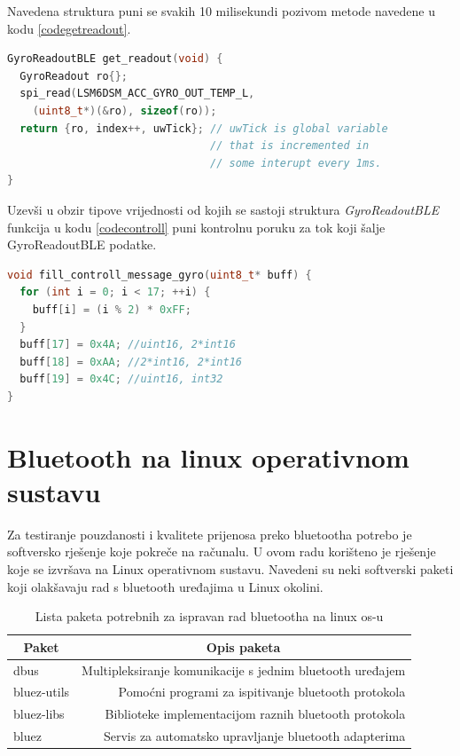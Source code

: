 \documentclass[times, utf8, diplomski]{diplomski}
\begin{document}
Navedena struktura puni se svakih 10 milisekundi pozivom metode navedene u kodu \ref{codegetreadout}.

\begin{lstlisting}[language=c++, caption={Dohvaćanje očitanja s LSM6DSM senzora}, label={codegetreadout}]
GyroReadoutBLE get_readout(void) {
  GyroReadout ro{};
  spi_read(LSM6DSM_ACC_GYRO_OUT_TEMP_L,
    (uint8_t*)(&ro), sizeof(ro));
  return {ro, index++, uwTick}; // uwTick is global variable
                                // that is incremented in 
                                // some interupt every 1ms.
}
\end{lstlisting}

Uzevši u obzir tipove vrijednosti od kojih se sastoji struktura \textit{GyroReadoutBLE} funkcija u kodu \ref{codecontroll} puni kontrolnu poruku za tok koji šalje GyroReadoutBLE podatke.

\begin{lstlisting}[language=c++, caption={Funkcija koja puni kontrolnu poruku za žiroskopske podatke}, label={codecontroll}]
void fill_controll_message_gyro(uint8_t* buff) {
  for (int i = 0; i < 17; ++i) {
    buff[i] = (i % 2) * 0xFF;
  }
  buff[17] = 0x4A; //uint16, 2*int16
  buff[18] = 0xAA; //2*int16, 2*int16
  buff[19] = 0x4C; //uint16, int32
}
\end{lstlisting}

\section{Bluetooth na linux operativnom sustavu}
Za testiranje pouzdanosti i kvalitete prijenosa preko bluetootha potrebo je softversko rješenje koje pokreče na računalu. U ovom radu korišteno je rješenje koje se izvršava na Linux operativnom sustavu. Navedeni su neki softverski paketi koji olakšavaju rad s bluetooth uređajima u Linux okolini.

\begin{table}[H]
  \begin{center}
    \begin{tabular}[c]{l|r}
      \multicolumn{1}{c|}{\textbf{Paket}} & 
      \multicolumn{1}{c}{\textbf{Opis paketa}} \\
      \hline
      dbus & Multipleksiranje komunikacije s jednim bluetooth uređajem \\
      bluez-utils & Pomoćni programi za ispitivanje bluetooth protokola \\
      bluez-libs & Biblioteke implementacijom raznih bluetooth protokola \\
      bluez & Servis za automatsko upravljanje bluetooth adapterima \\
      \hline
    \end{tabular}
  \caption{Lista paketa potrebnih za ispravan rad bluetootha na linux os-u}
  \end{center}
\end{table}
\end{document}
